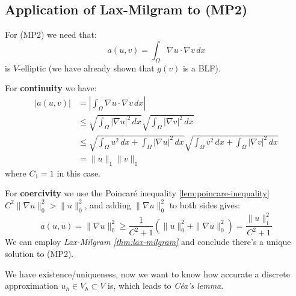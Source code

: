 \subsection{Application of Lax-Milgram to (MP2)}
For (MP2) we need that:
\[
    a(u, v) = \int_\Omega \nabla u \cdot \nabla v \, dx
\]
is $V$-elliptic (we have already shown that $g(v)$ is a BLF).

For \textbf{continuity} we have:
\begin{align*}
    |a(u, v)| & = \left|\int_\Omega \nabla u \cdot \nabla v \, dx\right|                         \\
              & \leq \sqrt{\int_\Omega |\nabla u|^2 \, dx} \sqrt{\int_\Omega |\nabla v|^2 \, dx} \\
              & \leq \sqrt{\int_\Omega u^2 \, dx + \int_\Omega |\nabla u|^2 \, dx} \sqrt{\int_\Omega v^2 \, dx + \int_\Omega |\nabla v|^2 \, dx} \\
                & = \|u\|_1 \|v\|_1
\end{align*}
where $C_1 = 1$ in this case.

For \textbf{coercivity} we use the Poincaré inequality \ref{lem:poincare-inequality} $C^2 \|\nabla u\|_0^2 > \|u\|_0^2$, and adding $\|\nabla u\|_0^2$ to both sides gives:
\[
    a(u, u) = \|\nabla u\|_0^2 \geq \frac{1}{C^2 + 1} \left(\|u\|_0^2 + \|\nabla u\|_0^2\right) = \frac{\|u\|_1^2}{C^2 + 1}
\]
We can employ \emph{Lax-Milgram \ref{thm:lax-milgram}} and conclude there's a unique solution to (MP2).

We have existence/uniqueness, now we want to know how accurate a discrete approximation $u_h \in V_h \subset V$ is, which leads to \emph{Céa's lemma}.
